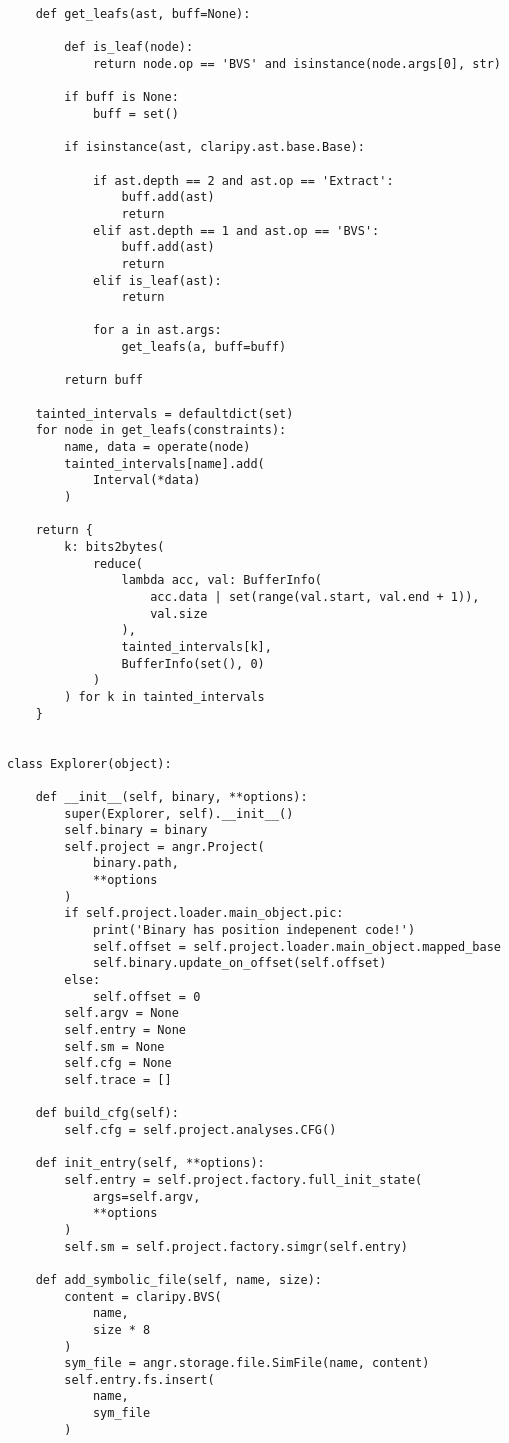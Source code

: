 \begin{lstlisting}
    def get_leafs(ast, buff=None):

        def is_leaf(node):
            return node.op == 'BVS' and isinstance(node.args[0], str)

        if buff is None:
            buff = set()

        if isinstance(ast, claripy.ast.base.Base):

            if ast.depth == 2 and ast.op == 'Extract':
                buff.add(ast)
                return
            elif ast.depth == 1 and ast.op == 'BVS':
                buff.add(ast)
                return
            elif is_leaf(ast):
                return

            for a in ast.args:
                get_leafs(a, buff=buff)

        return buff

    tainted_intervals = defaultdict(set)
    for node in get_leafs(constraints):
        name, data = operate(node)
        tainted_intervals[name].add(
            Interval(*data)
        )

    return {
        k: bits2bytes(
            reduce(
                lambda acc, val: BufferInfo(
                    acc.data | set(range(val.start, val.end + 1)),
                    val.size
                ),
                tainted_intervals[k],
                BufferInfo(set(), 0)
            )
        ) for k in tainted_intervals
    }


class Explorer(object):

    def __init__(self, binary, **options):
        super(Explorer, self).__init__()
        self.binary = binary
        self.project = angr.Project(
            binary.path,
            **options
        )
        if self.project.loader.main_object.pic:
            print('Binary has position indepenent code!')
            self.offset = self.project.loader.main_object.mapped_base
            self.binary.update_on_offset(self.offset)
        else:
            self.offset = 0
        self.argv = None
        self.entry = None
        self.sm = None
        self.cfg = None
        self.trace = []

    def build_cfg(self):
        self.cfg = self.project.analyses.CFG()

    def init_entry(self, **options):
        self.entry = self.project.factory.full_init_state(
            args=self.argv,
            **options
        )
        self.sm = self.project.factory.simgr(self.entry)

    def add_symbolic_file(self, name, size):
        content = claripy.BVS(
            name,
            size * 8
        )
        sym_file = angr.storage.file.SimFile(name, content)
        self.entry.fs.insert(
            name,
            sym_file
        )


\end{lstlisting}
